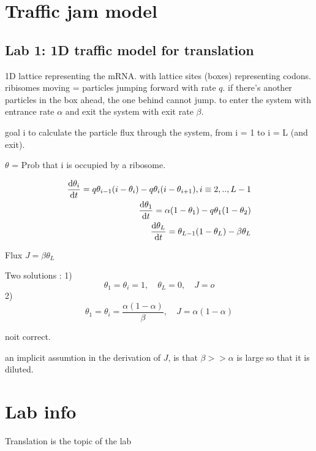 \documentclass{article}
\begin{document}
\section{Traffic jam model}
\subsection{Lab 1: 1D traffic model for translation}
1D lattice representing the mRNA. with lattice sites (boxes) representing codons. 
ribisomes moving = particles jumping forward with rate $q$.
if there's another particles in the box ahead, the one behind cannot jump. 
to enter the system with entrance rate $\alpha$ and exit the system with exit rate $\beta$.

goal i to calculate the particle flux through the system, from i = 1 to i = L (and exit). 

$\theta$ = Prob that i is occupied by a ribosome. 

\begin{equation}
	\begin{split}
	\dv{\theta_i}{t} = q\theta_{i-1}(i-\theta_i) -q\theta_i(i-\theta_{i+1}), i \equiv 2,..,L-1\\
	\dv{\theta_1}{t} = \alpha(1-\theta_1) -q\theta_1(1-\theta_{2})\\
	\dv{\theta_L}{t} = \theta_{L-1}(1-\theta_L) - \beta \theta_L\\
	\end{split}
\end{equation}

Flux $J= \beta \theta_L$



Two solutions  : 
1)
\begin{equation}
	\theta_1 = \theta_i = 1,\quad\theta_L=0,\quad J = o
\end{equation}
2)
\begin{equation}
	\theta_1 = \theta_i = \frac{\alpha(1-\alpha)}{\beta},\quad J = \alpha(1-\alpha)
\end{equation}

noit correct.

an implicit assumtion in the derivation of $J$, is that $\beta >> \alpha$ is large so that it is diluted. 





\section{Lab info}
Translation is the topic of the lab 
\end{document}
